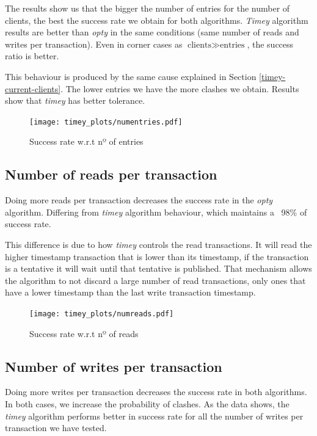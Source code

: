 \documentclass[a4paper, 10pt]{article}
\begin{document}
The results show us that the bigger the number of entries for the number of clients, the best the success rate we obtain for both algorithms. \textit{Timey} algorithm results are better than \textit{opty} in the same conditions (same number of reads and writes per transaction). Even in corner cases as $\text{clients} \gg \text{entries}$, the success ratio is better. 

This behaviour is produced by the same cause explained in Section \ref{timey-current-clients}. The lower entries we have the more clashes we obtain. Results show that \textit{timey} has better tolerance.

\begin{figure}[H]
  \centering
  \texttt{[image: timey\_plots/numentries.pdf]}
    \caption{Success rate w.r.t nº of entries}
    \label{timey:numentries}
\end{figure} 


\clearpage
\subsection{Number of reads per transaction}

Doing more reads per transaction decreases the success rate in the \textit{opty} algorithm. Differing from \textit{timey} algorithm behaviour, which maintains a ~98\% of success rate.

This difference is due to how \textit{timey} controls the read transactions. It will read the higher timestamp transaction that is lower than its timestamp, if the transaction is a tentative it will wait until that tentative is published. That mechanism allows the algorithm to not discard a large number of read transactions, only ones that have a lower timestamp than the last write transaction timestamp.

\begin{figure}[H]
  \centering
  \texttt{[image: timey\_plots/numreads.pdf]}
    \caption{Success rate w.r.t nº of reads}
    \label{timey:numreads}
\end{figure} 

\clearpage
\subsection{Number of writes per transaction}

Doing more writes per transaction decreases the success rate in both algorithms. In both cases, we increase the probability of clashes. As the data shows, the \textit{timey} algorithm performs better in success rate for all the number of writes per transaction we have tested.
\end{document}
